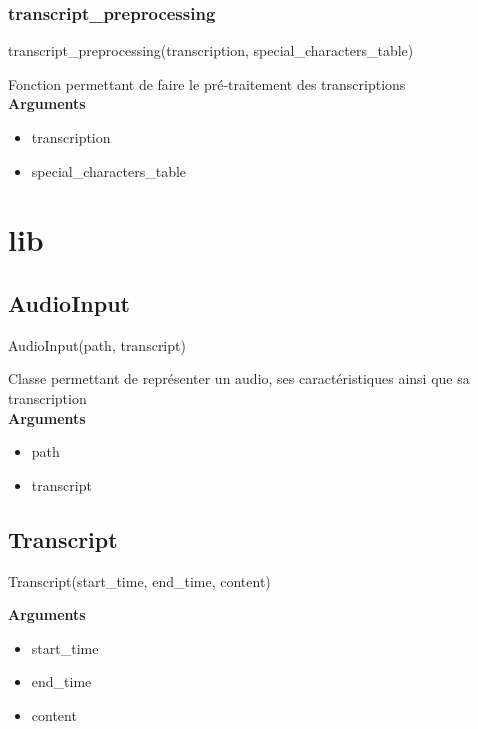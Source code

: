     \subsubsection{transcript\_preprocessing}
    \begin{tcolorbox}
    transcript\_preprocessing(transcription, special\_characters\_table)
    \end{tcolorbox}
    Fonction permettant de faire le pré-traitement des transcriptions \\
    \textbf{Arguments}
    \begin{itemize}
        \item transcription
        \item special\_characters\_table
    \end{itemize}
\section{lib}
    \subsection{AudioInput}
    \begin{tcolorbox}
    AudioInput(path, transcript)
    \end{tcolorbox}
    Classe permettant de représenter un audio, ses caractéristiques ainsi que sa transcription \\
    \textbf{Arguments}
    \begin{itemize}
        \item path
        \item transcript
    \end{itemize}
    \subsection{Transcript}
    \begin{tcolorbox}
    Transcript(start\_time, end\_time, content)
    \end{tcolorbox}
    \textbf{Arguments}
    \begin{itemize}
        \item start\_time
        \item end\_time
        \item content
    \end{itemize}
